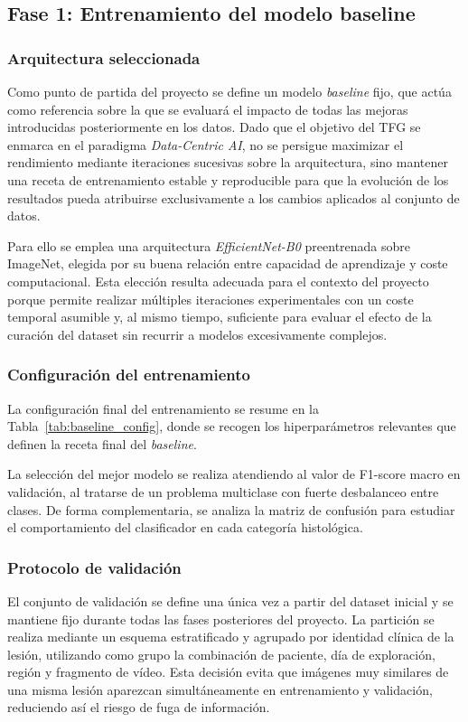 ﻿\documentclass[10pt,a4paper,twocolumn,twoside]{article}
\begin{document}
\subsection{Fase 1: Entrenamiento del modelo baseline}

\subsubsection{Arquitectura seleccionada}
Como punto de partida del proyecto se define un modelo \textit{baseline} fijo, que actúa como referencia sobre la que se evaluará el impacto de todas las mejoras introducidas posteriormente en los datos. Dado que el objetivo del TFG se enmarca en el paradigma \textit{Data-Centric AI}, no se persigue maximizar el rendimiento mediante iteraciones sucesivas sobre la arquitectura, sino mantener una receta de entrenamiento estable y reproducible para que la evolución de los resultados pueda atribuirse exclusivamente a los cambios aplicados al conjunto de datos.

Para ello se emplea una arquitectura \textit{EfficientNet-B0} preentrenada sobre ImageNet\cite{tan2019efficientnet}, elegida por su buena relación entre capacidad de aprendizaje y coste computacional. Esta elección resulta adecuada para el contexto del proyecto porque permite realizar múltiples iteraciones experimentales con un coste temporal asumible y, al mismo tiempo, suficiente para evaluar el efecto de la curación del dataset sin recurrir a modelos excesivamente complejos.

\subsubsection{Configuración del entrenamiento}
La configuración final del entrenamiento se resume en la Tabla~\ref{tab:baseline_config}, donde se recogen los hiperparámetros relevantes que definen la receta final del \textit{baseline}.

La selección del mejor modelo se realiza atendiendo al valor de F1-score macro en validación, al tratarse de un problema multiclase con fuerte desbalanceo entre clases. De forma complementaria, se analiza la matriz de confusión para estudiar el comportamiento del clasificador en cada categoría histológica.

\subsubsection{Protocolo de validación}
El conjunto de validación se define una única vez a partir del dataset inicial y se mantiene fijo durante todas las fases posteriores del proyecto. La partición se realiza mediante un esquema estratificado y agrupado por identidad clínica de la lesión, utilizando como grupo la combinación de paciente, día de exploración, región y fragmento de vídeo. Esta decisión evita que imágenes muy similares de una misma lesión aparezcan simultáneamente en entrenamiento y validación, reduciendo así el riesgo de fuga de información.
\end{document}
